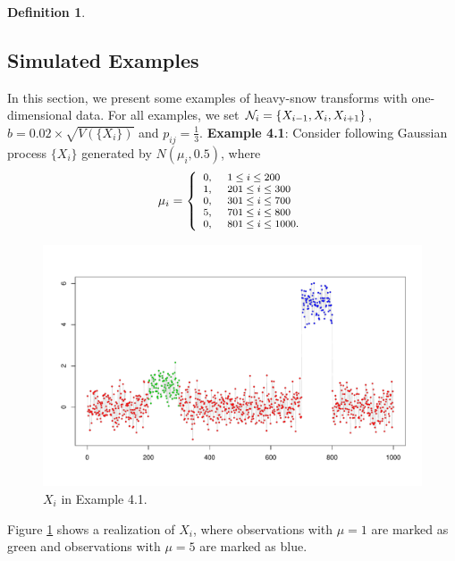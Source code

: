 \documentclass[preprint, review, 12pt]{article}
\theoremstyle{definition}
\newtheorem{dfn}{Definition}
\theoremstyle{remark}
\begin{document}
\begin{dfn}
\subsection{Simulated Examples}
In this section, we present some examples of heavy-snow transforms with one-dimensional data. For all examples, we set  ${\cal N}_i=\{X_{i-1},X_i,X_{i+1}\}$, $b=0.02\times \sqrt{V(\{X_i\})}$ and $p_{ij}=\frac{1}{3}$. 
\vskip 3mm
\noindent\textbf{Example 4.1}:
Consider following Gaussian process $\{X_i\}$ generated by $N(\mu_i,0.5)$, where 
\[
\footnotesize{\mu_i=\left\{
	\begin{array}{ll}
	0, &~1\le i \le 200\\
	1, &~201\le i \le 300\\
	0,&~301\le i \le 700\\
	5, &~701\le i \le 800\\
	0, &~801\le i \le 1000.\\
	\end{array}
	\right.}
\]
\begin{figure}
	\centering
	\includegraphics[width=1\textwidth]{Fig/snow_ex1_fig1.pdf}
	\caption{$X_i$ in Example 4.1.} 
	\label{snow:ex1_1}
\end{figure}
Figure \ref{snow:ex1_1} shows a realization of $X_i$, where observations with $\mu=1$ are marked as green and observations with $\mu=5$ are marked as blue.


\end{dfn}
\end{document}
